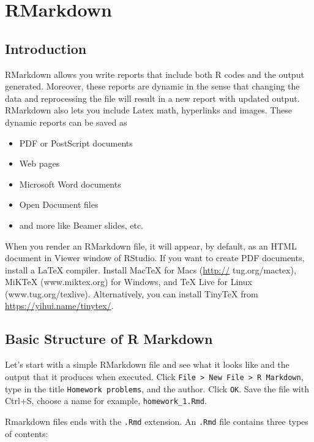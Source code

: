 \documentclass[
]{book}
\providecommand{\tightlist}{%
  \setlength{\itemsep}{0pt}\setlength{\parskip}{0pt}}
\begin{document}
\hypertarget{rmarkdown}{%
\section{RMarkdown}\label{rmarkdown}}

\hypertarget{introduction}{%
\subsection{Introduction}\label{introduction}}

RMarkdown allows you write reports that include both R codes and the
output generated. Moreover, these reports are dynamic in the sense that
changing the data and reprocessing the file will result in a new report
with updated output. RMarkdown also lets you include Latex math,
hyperlinks and images. These dynamic reports can be saved as

\begin{itemize}
\tightlist
\item
  PDF or PostScript documents
\item
  Web pages
\item
  Microsoft Word documents
\item
  Open Document files
\item
  and more like Beamer slides, etc.
\end{itemize}

When you render an RMarkdown file, it will appear, by default, as an
HTML document in Viewer window of RStudio. If you want to create PDF
documents, install a LaTeX compiler. Install MacTeX for Macs (\url{http://}
tug.org/mactex), MiKTeX (www.miktex.org) for Windows, and TeX Live for
Linux (www.tug.org/texlive). Alternatively, you can install TinyTeX from
\url{https://yihui.name/tinytex/}.

\hypertarget{basic-structure-of-r-markdown}{%
\subsection{Basic Structure of R Markdown}\label{basic-structure-of-r-markdown}}

Let's start with a simple RMarkdown file and see what it looks like and
the output that it produces when executed. Click
\texttt{File\ \textgreater{}\ New\ File\ \textgreater{}\ R\ Markdown}, type in the title \texttt{Homework\ problems},
and the author. Click \texttt{OK}. Save the file with Ctrl+S, choose
a name for example, \texttt{homework\_1.Rmd}.

Rmarkdown files ends with the \texttt{.Rmd} extension. An \texttt{.Rmd} file contains
three types of contents:
\end{document}
